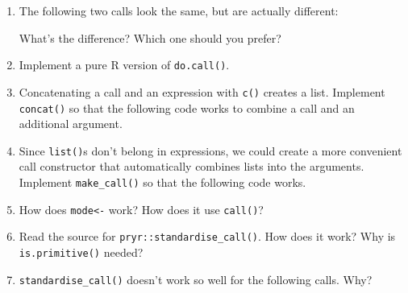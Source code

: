 \begin{enumerate}
\def\labelenumi{\arabic{enumi}.}
\item
  The following two calls look the same, but are actually different:

\begin{Shaded}
\begin{Highlighting}[]
\StringTok{ }\NormalTok{(}\NormalTok{, }\NormalTok{:}\NormalTok{))}
\StringTok{ }\NormalTok{(}\NormalTok{, }\NormalTok{(}\NormalTok{:}\NormalTok{)))}
\end{Highlighting}
\end{Shaded}

  What's the difference? Which one should you prefer?
\item
  Implement a pure R version of \texttt{do.call()}.
\item
  Concatenating a call and an expression with \texttt{c()} creates a
  list. Implement \texttt{concat()} so that the following code works to
  combine a call and an additional argument.

\begin{Shaded}
\begin{Highlighting}[]
\NormalTok{(} \NormalTok{, } \NormalTok{(}
\end{Highlighting}
\end{Shaded}
\item
  Since \texttt{list()}s don't belong in expressions, we could create a
  more convenient call constructor that automatically combines lists
  into the arguments. Implement \texttt{make\_call()} so that the
  following code works.

\begin{Shaded}
\begin{Highlighting}[]
\NormalTok{(}\NormalTok{(} \NormalTok{))}
\NormalTok{(} \NormalTok{)}
\end{Highlighting}
\end{Shaded}
\item
  How does \texttt{mode\textless{}-} work? How does it use
  \texttt{call()}?
\item
  Read the source for \texttt{pryr::standardise\_call()}. How does it
  work? Why is \texttt{is.primitive()} needed?
\item
  \texttt{standardise\_call()} doesn't work so well for the following
  calls. Why?


\end{enumerate}
